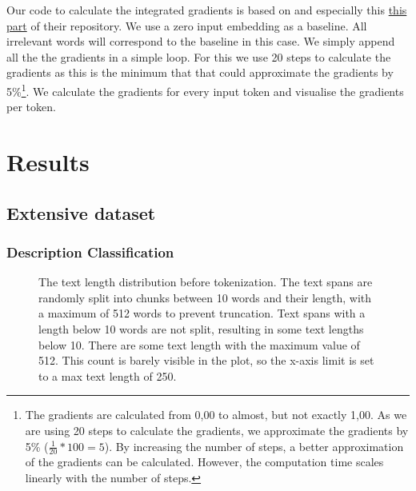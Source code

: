 \documentclass[a4paper, 12pt, oneside]{book} %
\begin{document}
Our code to calculate the integrated gradients is based on \textcite{gardner_allennlp_2017} and especially this  \href{https://github.com/allenai/allennlp/tree/master/allennlp/interpret}{this part} of their repository.
We use a zero input embedding as a baseline.
All irrelevant words will correspond to the baseline in this case.
We simply append all the the gradients in a simple loop.
For this we use 20 steps to calculate the gradients as this is the minimum that \textcite{sundararajan_axiomatic_2017} that could approximate the gradients by 5\%\footnote{The gradients are calculated from 0,00 to almost, but not exactly 1,00. As we are using 20 steps to calculate the gradients, we approximate the gradients by 5\% (\(\frac{1}{20} * 100 = 5\)). By increasing the number of steps, a better approximation of the gradients can be calculated. However, the computation time scales linearly with the number of steps.}.
We calculate the gradients for every input token and visualise the gradients per token.





\newpage
\section{Results}
\subsection{Extensive dataset}
\subsubsection{Description Classification}

\begin{figure} [t]
    \centering
    \vspace{0cm}
    \makebox[\textwidth][c]{}
    \caption[Text length distribution for training web crawler model]{The text length distribution before tokenization. The text spans are randomly split into chunks between 10 words and their length, with a maximum of 512 words to prevent truncation. Text spans with a length below 10 words are not split, resulting in some text lengths below 10. There are some text length with the maximum value of 512. This count is barely visible in the plot, so the x-axis limit is set to a max text length of 250.}
    \label{fig:text_length_distribution}
\end{figure}
\end{document}
